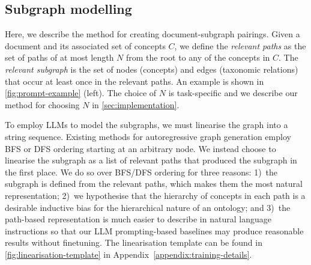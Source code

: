 \documentclass{article}
\newcommand{\fig}[1]{\textcolor{teal}{Figure: #1}}
\begin{document}
\subsection{Subgraph modelling}  \label{sec:method:subgraph}



Here, we describe the method for creating document-subgraph pairings. Given a document and its associated set of concepts $C$, we define the \emph{relevant paths} as the set of paths of at most length $N$ from the root to any of the concepts in $C$. The \emph{relevant subgraph} is the set of nodes (concepts) and edges (taxonomic relations) that occur at least once in the relevant paths. An example is shown in \cref{fig:prompt-example} (left). The choice of $N$ is task-specific and we describe our method for choosing $N$ in \cref{sec:implementation}. 

To employ LLMs to model the subgraphs, we must linearise the graph into a string sequence. Existing methods for autoregressive graph generation employ BFS \cite{you2018graphrnn} or DFS \cite{goyal2020graphgen} ordering starting at an arbitrary node. We instead choose to linearise the subgraph as a list of relevant paths that produced the subgraph in the first place. We do so over BFS/DFS ordering for three reasons: 1)~the subgraph is defined from the relevant paths, which makes them the most natural representation; 2)~we hypothesise that the hierarchy of concepts in each path is a desirable inductive bias for the hierarchical nature of an ontology; and 3)~the path-based representation is much easier to describe in natural language instructions so that our LLM prompting-based baselines may produce reasonable results without finetuning. The linearisation template can be found in \cref{fig:linearisation-template} in Appendix~\ref{appendix:training-details}.

\end{document}
